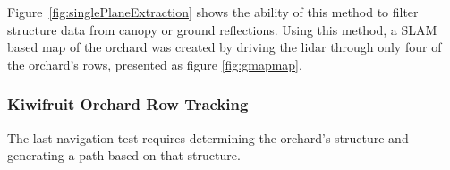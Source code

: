 \documentclass[preprint,authoryear,12pt]{elsarticle}
\begin{document}
        Figure~\ref{fig:singlePlaneExtraction} shows the ability of this method to filter structure data from canopy or ground reflections.
        Using this method, a SLAM based map of the orchard was created by driving the lidar through only four of the orchard's rows, presented as figure \ref{fig:gmapmap}.


    \subsubsection{Kiwifruit Orchard Row Tracking}
        The last navigation test requires determining the orchard's structure and generating a path based on that structure.
        
\end{document}
